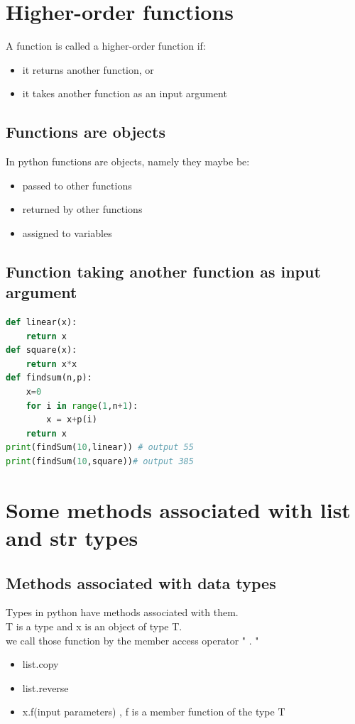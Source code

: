 \documentclass[12pt,oneside]{book}
\begin{document}
\section{Higher-order functions}
A function is called a higher-order function if:
\begin{itemize}
	\item it returns another function, or
	\item it takes another function as an input argument
\end{itemize}
\subsection{Functions are objects}
In python functions are objects, namely they maybe be:
\begin{itemize}
	\item passed to other functions
	\item returned by other functions
	\item assigned to variables
\end{itemize}
\subsection{Function taking another function as input argument}
{\small\begin{lstlisting}[language=python]
def linear(x):
	return x 
def square(x):
	return x*x  
def findsum(n,p):
	x=0 
	for i in range(1,n+1):
		x = x+p(i) 
	return x 
print(findSum(10,linear)) # output 55
print(findSum(10,square))# output 385
\end{lstlisting}}
\section{Some methods associated with list and str types}
\subsection{Methods associated with data types}
Types in python have methods associated with them.\\
T is a type and x is an object of type T.\\
we call those function by the member access operator " . "
\begin{itemize}
	\item list.copy
	\item list.reverse
	\item x.f(input parameters) , f is a member function of the type T
\end{itemize}
\end{document}
